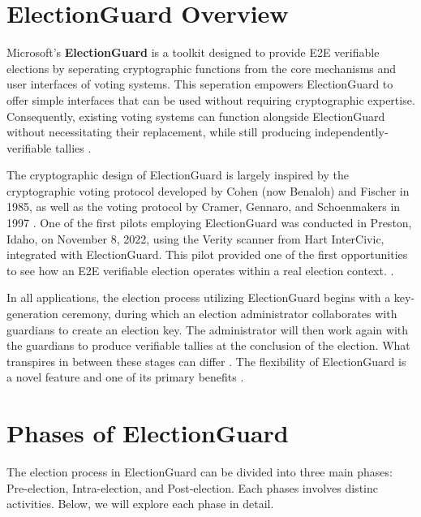 \section{ElectionGuard Overview}
Microsoft's \textbf{ElectionGuard} is a toolkit designed to provide \ac{E2E} verifiable elections by seperating cryptographic functions from the core mechanisms and user interfaces of voting systems. This seperation empowers ElectionGuard to offer simple interfaces that can be used without requiring cryptographic expertise. Consequently, existing voting systems can function alongside ElectionGuard without necessitating their replacement, while still producing independently-verifiable tallies \cite[1-2]{eg-paper}.

The cryptographic design of ElectionGuard is largely inspired by the cryptographic voting protocol developed by Cohen (now Benaloh) and Fischer in 1985, as well as the voting protocol by Cramer, Gennaro, and Schoenmakers in 1997 \cite[5]{eg-paper}. One of the first pilots employing ElectionGuard was conducted in Preston, Idaho, on November 8, 2022, using the Verity scanner from Hart InterCivic, integrated with ElectionGuard. This pilot provided one of the first opportunities to see how an E2E verifiable election operates within a real election context. \cite[4]{e2e-pilot}.

In all applications, the election process utilizing ElectionGuard begins with a key-generation ceremony, during which an election administrator collaborates with guardians to create an election key. The administrator will then work again with the guardians to produce verifiable tallies at the conclusion of the election. What transpires in between these stages can differ \cite[20]{eg-paper}. The flexibility of ElectionGuard is a novel feature and one of its primary benefits \cite[22]{eg-paper}.

\section{Phases of ElectionGuard}
The election process in ElectionGuard can be divided into three main phases: Pre-election, Intra-election, and Post-election. Each phases involves distinc activities. Below, we will explore each phase in detail.

